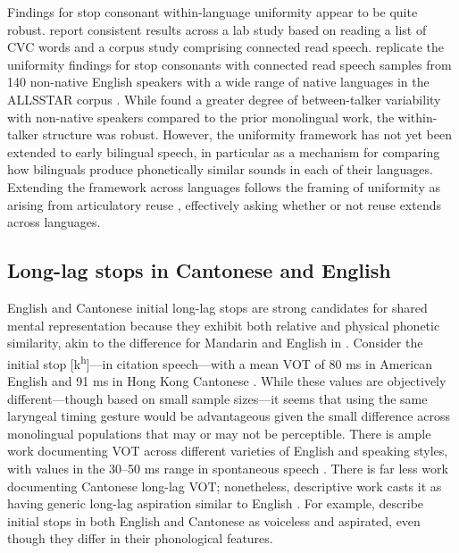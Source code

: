 Findings for stop consonant within-language uniformity appear to be quite robust. \citet{chodroff_2017_structure} report consistent results across a lab study based on reading a list of CVC words and a corpus study comprising connected read speech. \citet{chodroff_2019_l2} replicate the uniformity findings for stop consonants with connected read speech samples from 140 non-native English speakers with a wide range of native languages in the ALLSSTAR corpus \citep{bradlow_2011_allsstar}. While \citet{chodroff_2019_l2} found a greater degree of between-talker variability with non-native speakers compared to the prior monolingual work, the within-talker structure was robust. However, the uniformity framework has not yet been extended to early bilingual speech, in particular as a mechanism for comparing how bilinguals produce phonetically similar sounds in each of their languages. Extending the framework across languages follows the framing of uniformity as arising from articulatory reuse \citep{faytak_2018_uniformity}, effectively asking whether or not reuse extends across languages. 

\subsection{Long-lag stops in Cantonese and English}\label{ch4:sec:rqs}

English and Cantonese initial long-lag stops are strong candidates for shared mental representation because they exhibit both relative and physical phonetic similarity, akin to the difference for Mandarin and English in \citet{yang_2019_vot}. Consider the initial stop [k\textsuperscript{h}]---in citation speech---with a mean VOT of 80 ms in American English \citep{lisker_1964_vot} and 91 ms in Hong Kong Cantonese \citep{clumeck_1981_cantonese}. While these values are objectively different---though based on small sample sizes---it seems that using the same laryngeal timing gesture would be advantageous given the small difference across monolingual populations that may or may not be perceptible. There is ample work documenting VOT across different varieties of English and speaking styles, with values in the 30--50 ms range in spontaneous speech \citep{stuartsmith_2015_private}. There is far less work documenting Cantonese long-lag VOT; nonetheless, descriptive work casts it as having generic long-lag aspiration similar to English \citep{matthews_2013_cantonese, bauer_1997_cantonese, chan_2000_english, mielke_2018_voice}. For example, \citet{matthews_2013_cantonese} describe initial stops in both English and Cantonese as voiceless and aspirated, even though they differ in their phonological features. 
 
